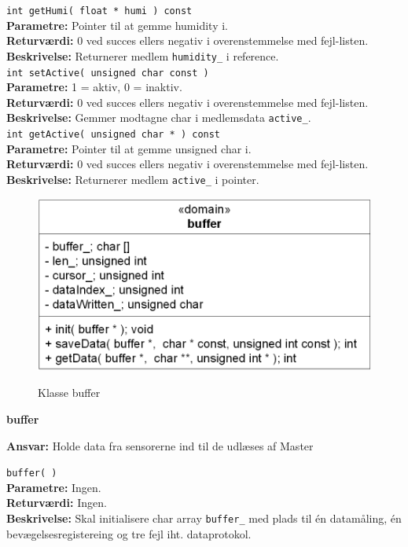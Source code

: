 \verb+int getHumi( float * humi ) const+ \\
\textbf{Parametre:} Pointer til at gemme humidity i. \\
\textbf{Returværdi:} 0 ved succes ellers negativ i overenstemmelse med fejl-listen. \\
\textbf{Beskrivelse:} Returnerer medlem \verb+humidity_+ i reference. \\

\verb+int setActive( unsigned char const )+ \\
\textbf{Parametre:} 1 = aktiv, 0 = inaktiv. \\
\textbf{Returværdi:} 0 ved succes ellers negativ i overenstemmelse med fejl-listen. \\
\textbf{Beskrivelse:} Gemmer modtagne char i medlemsdata \verb+active_+. \\

\verb+int getActive( unsigned char * ) const+ \\
\textbf{Parametre:} Pointer til at gemme unsigned char i. \\
\textbf{Returværdi:} 0 ved succes ellers negativ i overenstemmelse med fejl-listen. \\
\textbf{Beskrivelse:} Returnerer medlem \verb+active_+ i pointer. \\


\begin{figure}[htbp] \centering
{\includegraphics[scale=1.3]{filer/design/Klassediagrammer/sw_psoc_buffer}}
\caption{Klasse buffer}
\label{fig:sw_psoc_class_buffer}
\end{figure} 

{\centering
\textbf{buffer}\par
}
\textbf{Ansvar:} Holde data fra sensorerne ind til de udlæses af Master \

\verb+buffer( )+ \\
\textbf{Parametre:} Ingen. \\
\textbf{Returværdi:} Ingen. \\
\textbf{Beskrivelse:} Skal initialisere char array \verb+buffer_+ med plads til én datamåling, én bevægelsesregistereing og tre fejl iht. dataprotokol. \\

